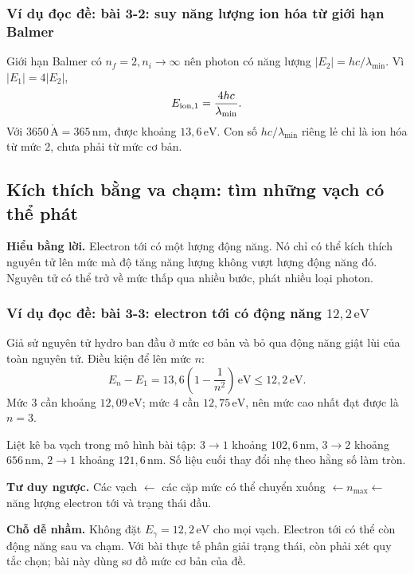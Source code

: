 \documentclass[11pt,a4paper]{article}
\newcommand{\unit}[1]{\,\mathrm{#1}}
\newcommand{\idea}[1]{\par\textbf{Hiểu bằng lời.} #1\par}
\newcommand{\think}[1]{\par\textbf{Tư duy ngược.} #1\par}
\newcommand{\trap}[1]{\par\textbf{Chỗ dễ nhầm.} #1\par}
\newcommand{\ex}[1]{\subsubsection*{Ví dụ đọc đề: #1}}
\begin{document}
\ex{bài 3-2: suy năng lượng ion hóa từ giới hạn Balmer}
Giới hạn Balmer có $n_f=2,n_i\to\infty$ nên photon có năng lượng
$|E_2|=hc/\lambda_{\min}$. Vì $|E_1|=4|E_2|$,
\[
E_{\rm ion,1}=\frac{4hc}{\lambda_{\min}}.
\]
Với $3650\unit{\mathring A}=365\unit{nm}$, được khoảng $13{,}6\unit{eV}$.
Con số $hc/\lambda_{\min}$ riêng lẻ chỉ là ion hóa từ mức 2, chưa phải từ mức cơ bản.

\subsection{Kích thích bằng va chạm: tìm những vạch có thể phát}\label{sec:collision}
\idea{Electron tới có một lượng động năng. Nó chỉ có thể kích thích
nguyên tử lên mức mà độ tăng năng lượng không vượt lượng động năng đó.
Nguyên tử có thể trở về mức thấp qua nhiều bước, phát nhiều loại photon.}

\ex{bài 3-3: electron tới có động năng $12{,}2\unit{eV}$}
Giả sử nguyên tử hydro ban đầu ở mức cơ bản và bỏ qua động năng giật lùi
của toàn nguyên tử. Điều kiện để lên mức $n$:
\[
E_n-E_1=13{,}6\left(1-\frac1{n^2}\right)\unit{eV}
\le12{,}2\unit{eV}.
\]
Mức 3 cần khoảng $12{,}09\unit{eV}$; mức 4 cần $12{,}75\unit{eV}$,
nên mức cao nhất đạt được là $n=3$.

\begin{center}
\end{center}

Liệt kê ba vạch trong mô hình bài tập:
$3\to1$ khoảng $102{,}6\unit{nm}$,
$3\to2$ khoảng $656\unit{nm}$,
$2\to1$ khoảng $121{,}6\unit{nm}$.
Số liệu cuối thay đổi nhẹ theo hằng số làm tròn.

\think{Các vạch $\leftarrow$ các cặp mức có thể chuyển xuống
$\leftarrow n_{\max}\leftarrow$ năng lượng electron tới và trạng thái đầu.}
\trap{Không đặt $E_\gamma=12{,}2\unit{eV}$ cho mọi vạch.
Electron tới có thể còn động năng sau va chạm. Với bài thực tế phân giải
trạng thái, còn phải xét quy tắc chọn; bài này dùng sơ đồ mức cơ bản của đề.}
\end{document}
